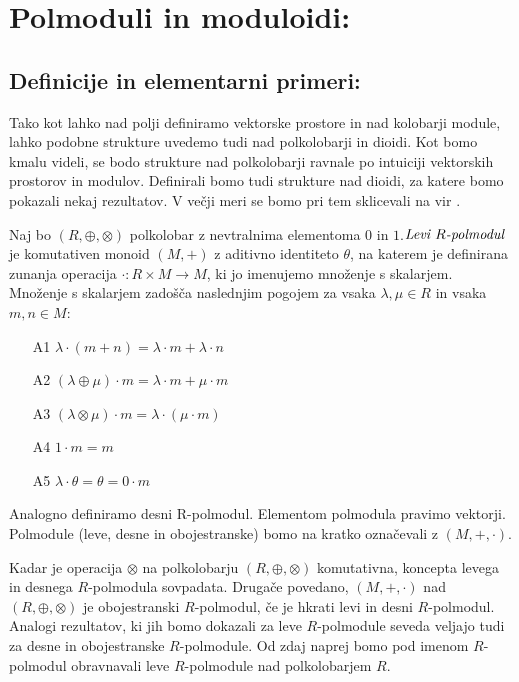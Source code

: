 \documentclass[mat1]{fmfdelo}
\newcommand{\pojem}[1]{\ensuremath{\emph{#1}}}
\newcommand{\map}[3]{\ensuremath{{#1}:{#2}\rightarrow{#3}}}
\begin{document}
\section{Polmoduli in moduloidi:}
\subsection{Definicije in elementarni primeri:}
Tako kot lahko nad polji definiramo vektorske prostore in nad kolobarji module, lahko podobne strukture uvedemo tudi nad polkolobarji in dioidi. Kot bomo kmalu videli, se bodo strukture nad polkolobarji ravnale po intuiciji vektorskih prostorov in modulov. Definirali bomo tudi strukture nad dioidi, za katere bomo pokazali nekaj rezultatov. V večji meri se bomo pri tem sklicevali na vir \cite[poglavje 5.\,2.\,]{bib:Gondran}.

\begin{definicija}\label{def:polmodul}
	Naj bo $(R, \oplus, \otimes)$ polkolobar z nevtralnima elementoma $0$ in $1$.\newline\pojem{Levi $R$-polmodul}~ je komutativen monoid $(M, +)$ z aditivno identiteto $\theta$, na katerem je definirana zunanja operacija \map{\cdot}{R\times M}{M}, ki jo imenujemo množenje s skalarjem. Množenje s skalarjem zadošča naslednjim pogojem za vsaka $\lambda,\mu\in R$ in vsaka $m, n\in M$:
	\begin{enumerate}
		\item[A1] $\lambda\cdot(m + n) = \lambda\cdot m + \lambda\cdot n$
		\item[A2] $(\lambda \oplus \mu)\cdot m = \lambda\cdot m + \mu\cdot m$
		\item[A3]  $(\lambda\otimes\mu) \cdot m = \lambda \cdot (\mu \cdot m)$
		\item[A4] $1\cdot m = m$
		\item[A5] $\lambda\cdot\theta = \theta = 0\cdot m$
	\end{enumerate}

Analogno definiramo desni R-polmodul. Elementom polmodula pravimo vektorji. Polmodule (leve, desne in obojestranske) bomo na kratko označevali z $(M, +, \cdot)$.
\end{definicija}

	 Kadar je operacija $\otimes$ na polkolobarju $(R,\oplus, \otimes)$ komutativna, koncepta levega in desnega $R$-polmodula sovpadata. Drugače povedano, $(M, +, \cdot)$ nad $(R, \oplus, \otimes)$ je obojestranski $R$-polmodul, če je hkrati levi in desni $R$-polmodul. Analogi rezultatov, ki jih bomo dokazali za leve $R$-polmodule seveda veljajo  tudi za desne in obojestranske $R$-polmodule. Od zdaj naprej bomo pod imenom $R$-polmodul obravnavali leve $R$-polmodule nad polkolobarjem $R$.
\end{document}
